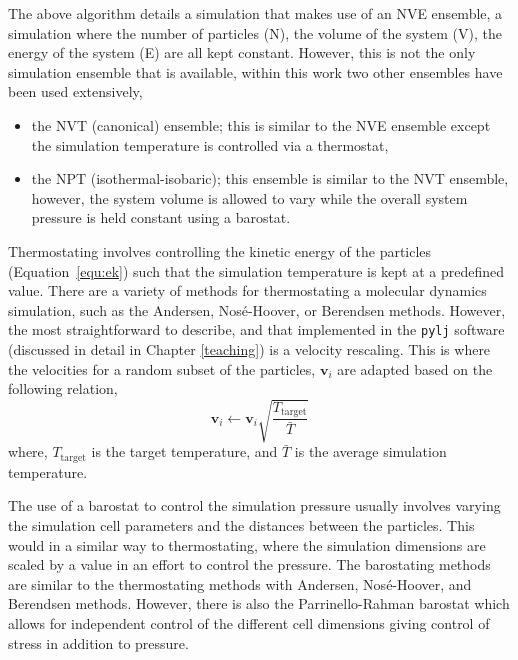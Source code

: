 The above algorithm details a simulation that makes use of an NVE ensemble, a simulation where the number of particles (N), the volume of the system (V), the energy of the system (E) are all kept constant.
However, this is not the only simulation ensemble that is available, within this work two other ensembles have been used extensively,
%
\begin{itemize}
\item the NVT (canonical) ensemble; this is similar to the NVE ensemble except the simulation temperature is controlled via a thermostat,
\item the NPT (isothermal-isobaric); this ensemble is similar to the NVT ensemble, however, the system volume is allowed to vary while the overall system pressure is held constant using a barostat.
\end{itemize}
%
Thermostating involves controlling the kinetic energy of the particles (Equation~\ref{equ:ek}) such that the simulation temperature is kept at a predefined value.
There are a variety of methods for thermostating a molecular dynamics simulation, such as the Andersen, Nos\'{e}-Hoover, or Berendsen methods.\autocite{andersen_molecular_1980,nose_unified_1984,berendsen_molecular_1984,hoover_canonical_1985}
However, the most straightforward to describe, and that implemented in the \texttt{pylj} software (discussed in detail in Chapter \ref{teaching}) \autocite{mccluskey_pylj_2018,mccluskey_arm61/pylj_2018} is a velocity rescaling.\autocite{bussi_canonical_2007}
This is where the velocities for a random subset of the particles, $\mathbf{v}_i$ are adapted based on the following relation,
%
\begin{equation}
\mathbf{v}_i \leftarrow \mathbf{v}_i \sqrt{\frac{T_{\text{target}}}{\bar{T}}}
\end{equation}
%
where, $T_{\text{target}}$ is the target temperature, and $\bar{T}$ is the average simulation temperature.

The use of a barostat to control the simulation pressure usually involves varying the simulation cell parameters and the distances between the particles.
This would in a similar way to thermostating, where the simulation dimensions are scaled by a value in an effort to control the pressure.
The barostating methods are similar to the thermostating methods with Andersen, Nos\'{e}-Hoover, and Berendsen methods.
However, there is also the Parrinello-Rahman barostat which allows for independent control of the different cell dimensions giving control of stress in addition to pressure.\autocite{parrinello_polymorphic_1981}

